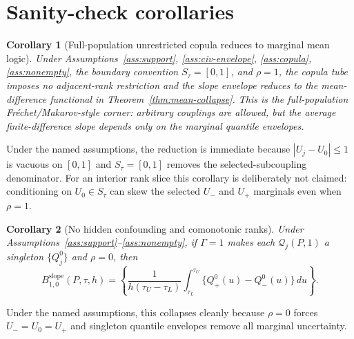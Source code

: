 \documentclass[11pt]{article}
\theoremstyle{definition}
\theoremstyle{plain}
\newtheorem{corollary}{Corollary}
\theoremstyle{remark}
\begin{document}
\section{Sanity-check corollaries}
\begin{corollary}[Full-population unrestricted copula reduces to marginal mean logic]\label{cor:frechet}
Under Assumptions~\ref{ass:support}, \ref{ass:civ-envelope}, \ref{ass:copula}, \ref{ass:nonempty}, the boundary convention \(S_\tau=[0,1]\), and \(\rho=1\), the copula tube imposes no adjacent-rank restriction and the slope envelope reduces to the mean-difference functional in Theorem~\ref{thm:mean-collapse}.  This is the full-population Fréchet/Makarov-style corner: arbitrary couplings are allowed, but the average finite-difference slope depends only on the marginal quantile envelopes.
\end{corollary}
Under the named assumptions, the reduction is immediate because \(|U_j-U_0|\le1\) is vacuous on \([0,1]\) and \(S_\tau=[0,1]\) removes the selected-subcoupling denominator.  For an interior rank slice this corollary is deliberately not claimed: conditioning on \(U_0\in S_\tau\) can skew the selected \(U_-\) and \(U_+\) marginals even when \(\rho=1\).

\begin{corollary}[No hidden confounding and comonotonic ranks]\label{cor:point-collapse}
Under Assumptions~\ref{ass:support}--\ref{ass:nonempty}, if \(\Gamma=1\) makes each \(\mathcal Q_j(P,1)\) a singleton \(\{Q_j^0\}\) and \(\rho=0\), then
\[
B_{1,0}^{\mathrm{slope}}(P,\tau,h)
=
\left\{
\frac{1}{h(\tau_U-\tau_L)}
\int_{\tau_L}^{\tau_U}\{Q_+^0(u)-Q_-^0(u)\}\,du
\right\}.
\]
\end{corollary}
Under the named assumptions, this collapses cleanly because \(\rho=0\) forces \(U_-=U_0=U_+\) and singleton quantile envelopes remove all marginal uncertainty.
\end{document}
